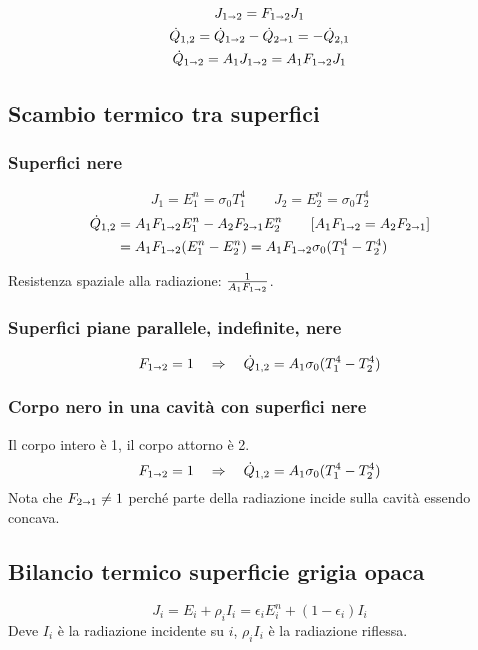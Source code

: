 \begin{equation*}
    \begin{gathered}
        J_{1\shortrightarrow 2} = F_{1\shortrightarrow 2}J_1 \\
        \dot{Q}_{1,2} = \dot{Q}_{1\shortrightarrow 2} - \dot{Q}_{2\shortrightarrow 1} = -\dot{Q}_{2,1} \\
        \dot{Q}_{1\shortrightarrow 2} = A_1J_{1\shortrightarrow 2} = A_1F_{1\shortrightarrow 2}J_1
    \end{gathered}
\end{equation*}

\subsection{Scambio termico tra superfici}

\subsubsection{Superfici nere}
\[
    J_1 = E^n_1 = \sigma_0T_1^4 \qquad J_2 = E^n_2 = \sigma_0T_2^4
\]
\begin{align*}
    \dot{Q}_{1,2} &= A_1F_{1\shortrightarrow 2}E_1^n - A_2F_{2\shortrightarrow 1}E_2^n \qquad [A_1F_{1\shortrightarrow 2} = A_2F_{2\shortrightarrow 1}] \\
        &= A_1F_{1\shortrightarrow 2} (E_1^n - E_2^n) = A_1F_{1\shortrightarrow 2}\sigma_0(T_1^4 - T_2^4)
\end{align*}

Resistenza spaziale alla radiazione: $\frac{1}{A_1F_{1\shortrightarrow 2}}$.

\subsubsection{Superfici piane parallele, indefinite, nere}
\[
    F_{1\shortrightarrow 2} = 1 \quad \Rightarrow \quad \dot{Q}_{1,2} = A_1\sigma_0(T_1^4 - T_2^4)
\]

\subsubsection{Corpo nero in una cavità con superfici nere}
Il corpo intero è 1, il corpo attorno è 2.
\[
    F_{1\shortrightarrow 2} = 1 \quad \Rightarrow \quad \dot{Q}_{1,2} = A_1\sigma_0(T_1^4 - T_2^4)
\]
Nota che $F_{2\shortrightarrow 1} \ne 1$ perché parte della radiazione incide sulla cavità essendo concava.

\subsection{Bilancio termico superficie grigia opaca}
\[
    J_i = E_i + \rho_iI_i = \epsilon_iE_i^n + (1-\epsilon_i)I_i
\]
Deve $I_i$ è la radiazione incidente su $i$, $\rho_i I_i$ è la radiazione riflessa.

